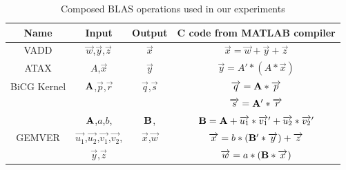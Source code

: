\documentclass[runningheads]{llncs}
\begin{document}
\begin{table}[htb] 
\vspace{-.1in} 
\caption{Composed BLAS operations used in our experiments}
\label{tbl:blas-ops}
\small
\centering 
\vspace{-.1in} 
\begin{tabular}{|c|c|c|c|} 
\hline 
Name & Input & Output & C code from MATLAB compiler \\
\hline 
\hline 
VADD & $\overrightarrow{w}$,$\overrightarrow{y}$,$\overrightarrow{z}$ & $\overrightarrow{x}$ &
$\overrightarrow{x} = \overrightarrow{w} + \overrightarrow{y} + \overrightarrow{z}$ \\ 
\hline 
ATAX & $A$,$\overrightarrow{x}$ & $\overrightarrow{y}$ & 
$\overrightarrow{y} = A' * (A * \overrightarrow{x})$ \\ 
\hline 
BiCG Kernel & ${\bf A}$,$\overrightarrow{p}$,$\overrightarrow{r}$ & $\overrightarrow{q}$,$\overrightarrow{s}$ & $\overrightarrow{q} = {\bf A} * \overrightarrow{p}$ \\
& & & $\overrightarrow{s} = {\bf A}' * \overrightarrow{r}$\\
\hline 
 & ${\bf A}$,$a$,$b$, & ${\bf B}$, & ${\bf B} = {\bf A} + \overrightarrow{u_1} * \overrightarrow{v_1}' + \overrightarrow{u_2} * \overrightarrow{v_2}'$\\
GEMVER & $\overrightarrow{u_1}$,$\overrightarrow{u_2}$,$\overrightarrow{v_1}$,$\overrightarrow{v_2}$, & $\overrightarrow{x}$,$\overrightarrow{w}$ & $\overrightarrow{x} = b * ({\bf B}' * \overrightarrow{y}) + \overrightarrow{z}$\\
& $\overrightarrow{y}$,$\overrightarrow{z}$ & & $\overrightarrow{w} = a * ({\bf B} * \overrightarrow{x})$\\
\hline 
\end{tabular} 
\vspace{-.2in} 
\end{table} 
\end{document}
